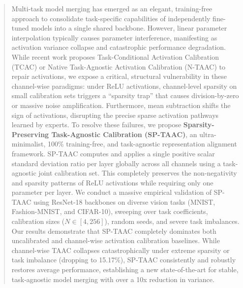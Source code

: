 \documentclass{article}
\theoremstyle{plain}
\theoremstyle{definition}
\theoremstyle{remark}
\begin{document}

\printAffiliationsAndNotice{}  %

\begin{abstract}
Multi-task model merging has emerged as an elegant, training-free approach to consolidate task-specific capabilities of independently fine-tuned models into a single shared backbone. However, linear parameter interpolation typically causes parameter interference, manifesting as activation variance collapse and catastrophic performance degradation. While recent work proposes Task-Conditional Activation Calibration (TCAC) or Native Task-Agnostic Activation Calibration (N-TAAC) to repair activations, we expose a critical, structural vulnerability in these channel-wise paradigms: under ReLU activations, channel-level sparsity on small calibration sets triggers a ``sparsity trap'' that causes division-by-zero or massive noise amplification. Furthermore, mean subtraction shifts the sign of activations, disrupting the precise sparse activation pathways learned by experts. To resolve these failures, we propose \textbf{Sparsity-Preserving Task-Agnostic Calibration (SP-TAAC)}, an ultra-minimalist, 100\% training-free, and task-agnostic representation alignment framework. SP-TAAC computes and applies a single positive scalar standard deviation ratio per layer globally across all channels using a task-agnostic joint calibration set. This completely preserves the non-negativity and sparsity patterns of ReLU activations while requiring only one parameter per layer. We conduct a massive empirical validation of SP-TAAC using ResNet-18 backbones on diverse vision tasks (MNIST, Fashion-MNIST, and CIFAR-10), sweeping over task coefficients, calibration sizes ($N \in [4, 256]$), random seeds, and severe task imbalances. Our results demonstrate that SP-TAAC completely dominates both uncalibrated and channel-wise activation calibration baselines. While channel-wise TAAC collapses catastrophically under extreme sparsity or task imbalance (dropping to 15.17\%), SP-TAAC consistently and robustly restores average performance, establishing a new state-of-the-art for stable, task-agnostic model merging with over a 10x reduction in variance.
\end{abstract}
\end{document}
